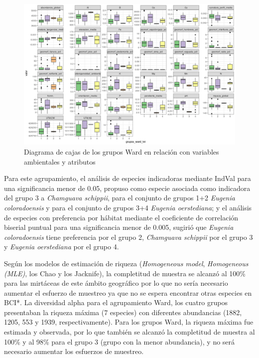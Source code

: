 \documentclass[11pt,]{article}
\begin{document}
\begin{figure}
\centering
\includegraphics{correlograma_wardyvariablesambientales.png}
\caption{Diagrama de cajas de los grupos Ward en relación con variables
ambientales y atributos \label{fig:ward_con_variables}}
\end{figure}

Para este agrupamiento, el análisis de especies indicadoras mediante
IndVal para una significancia menor de 0.05, propuso como especie
asociada como indicadora del grupo 3 a \emph{Chamguava schippii}, para
el conjunto de grupos 1+2 \emph{Eugenia coloradoensis} y para el
conjunto de grupos 3+4 \emph{Eugenia oerstediana}; y el análisis de
especies con preferencia por hábitat mediante el coeficiente de
correlación biserial puntual para una significancia menor de 0.005,
sugirió que \emph{Eugenia coloradoensis} tiene preferencia por el grupo
2, \emph{Chamguava schippii} por el grupo 3 y \emph{Eugenia oerstediana}
por el grupo 4.

Según los modelos de estimación de riqueza (\emph{Homogeneous model},
\emph{Homogeneous (MLE)}, los Chao y los Jacknife), la completitud de
muestra se alcanzó al 100\% para las mirtáceas de este ámbito geográfico
por lo que no sería necesario aumentar el esfuerzo de muestreo ya que no
se espera encontrar otras especies en BCI*. La diversidad alpha para el
agrupamiento Ward, los cuatro grupos presentaban la riqueza máxima (7
especies) con diferentes abundancias (1882, 1205, 553 y 1939,
respectivamente). Para los grupos Ward, la riqueza máxima fue estimada y
observada, por lo que también se alcanzó la completitud de muestra al
100\% y al 98\% para el grupo 3 (grupo con la menor abundancia), y no
será necesario aumentar los esfuerzos de muestreo.
\end{document}
